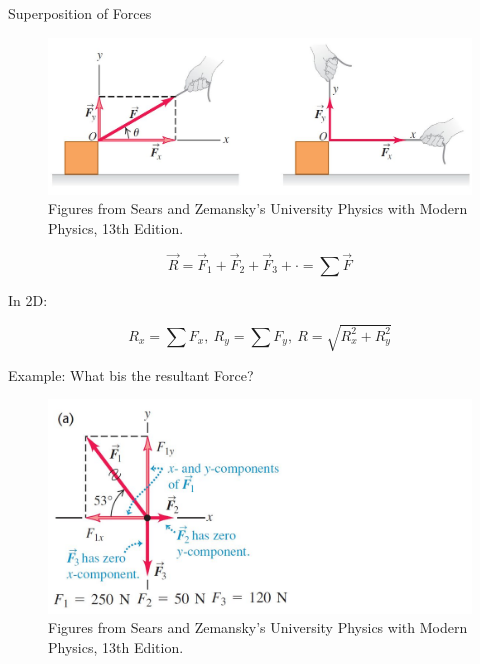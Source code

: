 \documentclass[]{beamer}
\begin{document}
\begin{frame}

 Superposition of Forces
         
 \begin{figure}[h!]  
  \includegraphics[width=1.\textwidth]{images/f6.jpg}
  \caption{ {\tiny Figures from Sears and Zemansky's University Physics 
  with Modern Physics, 13th Edition.} }
\end{figure}


  
    \begin{equation}
      \vec{R}=\vec{F}_1+\vec{F}_2+\vec{F}_3+\cdot=\sum \vec{F}
    \end{equation}
    
      \pause
   In 2D:
   
   \begin{equation}
    R_x=\sum F_x,~R_y=\sum F_y,~R=\sqrt{R^2_x+R^2_y}
   \end{equation}
      
      \end{frame}
  



\begin{frame}

  Example: What bis the resultant Force?
    
\begin{figure}[h!]  
   \includegraphics[width=1.\textwidth]{images/f7.jpg}
   \caption{ {\tiny Figures from Sears and Zemansky's University Physics 
   with Modern Physics, 13th Edition.} }
 \end{figure}
 
\end{frame}
  
\end{document}
